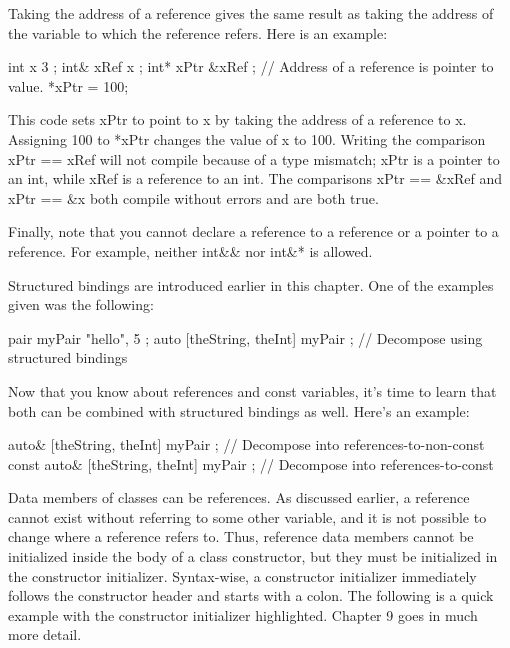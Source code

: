 Taking the address of a reference gives the same result as taking the address of the variable to which the reference refers. Here is an example:

\begin{cpp}
int x { 3 };
int& xRef { x };
int* xPtr { &xRef }; // Address of a reference is pointer to value.
*xPtr = 100;
\end{cpp}

This code sets xPtr to point to x by taking the address of a reference to x. Assigning 100 to *xPtr changes the value of x to 100. Writing the comparison xPtr == xRef will not compile because of a type mismatch; xPtr is a pointer to an int, while xRef is a reference to an int. The comparisons xPtr == \&xRef and xPtr == \&x both compile without errors and are both true.

Finally, note that you cannot declare a reference to a reference or a pointer to a reference. For example, neither int\&\& nor int\&* is allowed.


Structured bindings are introduced earlier in this chapter. One of the examples given was the following:

\begin{cpp}
pair myPair { "hello", 5 };
auto [theString, theInt] { myPair }; // Decompose using structured bindings
\end{cpp}

Now that you know about references and const variables, it’s time to learn that both can be combined with structured bindings as well. Here’s an example:

\begin{cpp}
auto& [theString, theInt] { myPair }; // Decompose into references-to-non-const
const auto& [theString, theInt] { myPair }; // Decompose into references-to-const
\end{cpp}


Data members of classes can be references. As discussed earlier, a reference cannot exist without referring to some other variable, and it is not possible to change where a reference refers to. Thus, reference data members cannot be initialized inside the body of a class constructor, but they must be initialized in the constructor initializer. Syntax-wise, a constructor initializer immediately follows the constructor header and starts with a colon. The following is a quick example with the constructor initializer highlighted. Chapter 9 goes in much more detail.

